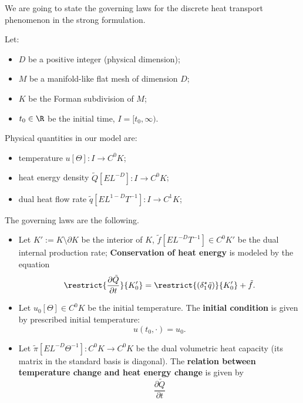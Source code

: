 \begin{discussion}
  We are going to state the governing laws for the discrete heat transport
  phenomenon in the strong formulation.

  Let:
  \begin{itemize}
    \item $D$ be a positive integer (physical dimension);
    \item $M$ be a manifold-like flat mesh of dimension $D$;
    \item $K$ be the Forman subdivision of $M$;
    \item $t_0 \in \R$ be the initial time, $I = [t_0, \infty)$.
  \end{itemize}
  Physical quantities in our model are:
  \begin{itemize}
    \item
      temperature $u [\Theta] \colon I \to C^0 K$;
    \item
      heat energy density $\tilde{Q} [E L^{-D}] \colon I \to C^0 K$;
    \item
      dual heat flow rate $\tilde{q} [E L^{1 - D} T^{-1}] \colon I \to C^1 K$;
  \end{itemize}
  The governing laws are the following.
  \begin{itemize}
    \item
      Let
        $K' := K \setminus \partial K$ be the interior of $K$,
        $\tilde{f} [E L^{-D} T^{-1}]\in C^0 K'$
        be the dual internal production rate;
      \textbf{Conservation of heat energy} is modeled by the equation
      \begin{equation}
        \restrict{\frac{\partial \tilde{Q}}{\partial t}}{K'_0} =
        \restrict{(\delta_1^\star \tilde{q})}{K'_0} + \tilde{f}.
      \end{equation}
    \item
      Let $u_0 [\Theta] \in C^0 K$ be the initial temperature.
      The \textbf{initial condition} is given by prescribed initial temperature:
      \begin{equation}
        u(t_0, \cdot) = u_0.
      \end{equation}
    \item
      Let $\tilde{\pi} [E L^{-D} \Theta^{-1}] \colon C^0 K \to C^0 K$
      be the dual volumetric heat capacity
      (its matrix in the standard basis is diagonal).
      The \textbf{relation between temperature change and heat energy change}
      is given by
      \begin{equation}
        \frac{\partial \tilde{Q}}{\partial t}

\end{equation}
\end{itemize}
\end{discussion}
